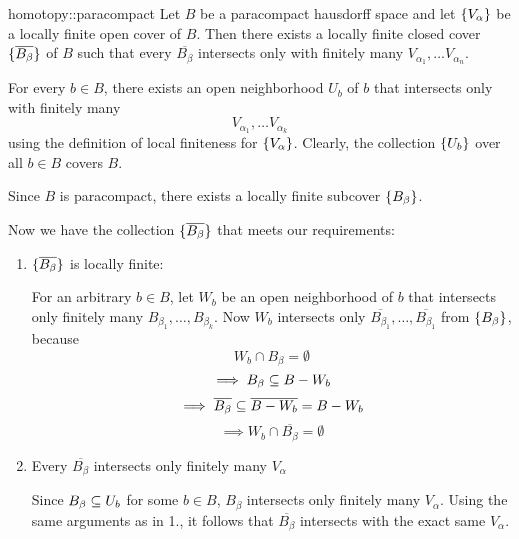 \begin{mylemma}{homotopy::paracompact}
    Let $B$ be a paracompact hausdorff space and let $\{V_\alpha\}$
    be a locally finite open cover of $B$.
    Then there exists a locally finite closed cover $\{\overline{B_\beta}\}$ of $B$
    such that every $\overline{B_\beta}$ intersects only with
    finitely many $V_{\alpha_1}, \dots V_{\alpha_n}$.
\end{mylemma}

\begin{myproof}
    For every $b \in B$, there exists an open neighborhood $U_b$ of $b$ that intersects only with finitely many
    \[ V_{\alpha_1}, \dots V_{\alpha_k} \]
    using the definition of local finiteness for $\{V_\alpha\}$.
    Clearly, the collection $\{U_b\}$ over all $b \in B$ covers $B$.

    Since $B$ is paracompact, there exists a locally finite subcover $\{B_\beta\}$.

    Now we have the collection $\{\overline{B_\beta}\}$ that meets our requirements:
    \begin{enumerate}
        \item $\{\overline{B_\beta}\}$ is locally finite:
        
        For an arbitrary $b \in B$, let $W_b$ be an open neighborhood of $b$ that intersects only finitely many $B_{\beta_1}, \dots, B_{\beta_k}$.
        Now $W_b$ intersects only $\overline{B_{\beta_1}}, \dots, \overline{B_{\beta_1}}$ from $\{B_\beta\}$, because
        \[ W_b \cap B_\beta = \emptyset \]
        \[ \implies B_\beta \subseteq{} B - W_b \]
        \[ \implies \overline{B_\beta} \subseteq{} \overline{B - W_b} = B - W_b \]
        \[ \implies W_b \cap \overline{B_\beta} = \emptyset \]

        \item Every $\overline{B_\beta}$ intersects only finitely many $V_\alpha$
        
        Since $B_\beta \subseteq{} U_b$ for some $b \in B$, $B_\beta$ intersects only finitely many $V_\alpha$.
        Using the same arguments as in 1., it follows that $\overline{B_\beta}$ intersects with the exact same $V_\alpha$.
    \end{enumerate}
\end{myproof}